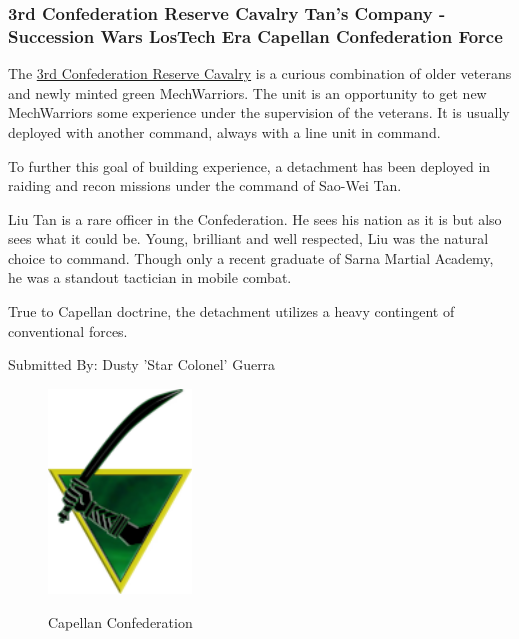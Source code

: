 \subsubsection{3rd Confederation Reserve Cavalry Tan's Company - Succession Wars LosTech Era Capellan Confederation Force}

The \href{https://www.sarna.net/wiki/3rd_Confederation_Reserve_Cavalry}{3rd Confederation Reserve Cavalry} is a curious combination of older veterans and newly minted green MechWarriors.
The unit is an opportunity to get new MechWarriors some experience under the supervision of the veterans.
It is usually deployed with another command, always with a line unit in command.

To further this goal of building experience, a detachment has been deployed in raiding and recon missions under the command of Sao-Wei Tan.

Liu Tan is a rare officer in the Confederation.
He sees his nation as it is but also sees what it could be.
Young, brilliant and well respected, Liu was the natural choice to command.
Though only a recent graduate of Sarna Martial Academy, he was a standout tactician in mobile combat.

True to Capellan doctrine, the detachment utilizes a heavy contingent of conventional forces.

Submitted By: Dusty 'Star Colonel' Guerra

\begin{figure}[!h]
  \centering
  \includegraphics[alt='Capellan Confederation Logo', width=1.5in, height=2.139in]{img/Capellan-Confederation.png}
  \caption*{Capellan Confederation}
\end{figure}


